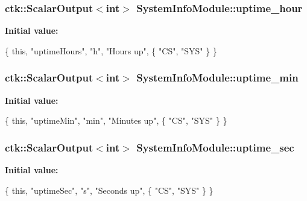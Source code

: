\subsubsection[{\texorpdfstring{uptime\+\_\+hour}{uptime_hour}}]{\setlength{\rightskip}{0pt plus 5cm}ctk\+::\+Scalar\+Output$<$int$>$ System\+Info\+Module\+::uptime\+\_\+hour}\hypertarget{classSystemInfoModule_a86c24e2c6715718cdcd5cb3596217f51}{}\label{classSystemInfoModule_a86c24e2c6715718cdcd5cb3596217f51}
{\bfseries Initial value\+:}
\begin{DoxyCode}
\{ \textcolor{keyword}{this}, \textcolor{stringliteral}{"uptimeHours"}, \textcolor{stringliteral}{"h"}, \textcolor{stringliteral}{"Hours up"},
    \{ \textcolor{stringliteral}{"CS"}, \textcolor{stringliteral}{"SYS"} \} \}
\end{DoxyCode}
\subsubsection[{\texorpdfstring{uptime\+\_\+min}{uptime_min}}]{\setlength{\rightskip}{0pt plus 5cm}ctk\+::\+Scalar\+Output$<$int$>$ System\+Info\+Module\+::uptime\+\_\+min}\hypertarget{classSystemInfoModule_a04d9e19050ba392140edc607cb2db40e}{}\label{classSystemInfoModule_a04d9e19050ba392140edc607cb2db40e}
{\bfseries Initial value\+:}
\begin{DoxyCode}
\{ \textcolor{keyword}{this}, \textcolor{stringliteral}{"uptimeMin"}, \textcolor{stringliteral}{"min"}, \textcolor{stringliteral}{"Minutes up"},
    \{ \textcolor{stringliteral}{"CS"}, \textcolor{stringliteral}{"SYS"} \} \}
\end{DoxyCode}
\subsubsection[{\texorpdfstring{uptime\+\_\+sec}{uptime_sec}}]{\setlength{\rightskip}{0pt plus 5cm}ctk\+::\+Scalar\+Output$<$int$>$ System\+Info\+Module\+::uptime\+\_\+sec}\hypertarget{classSystemInfoModule_af6f5afca2c2c21512f1ce728436862b4}{}\label{classSystemInfoModule_af6f5afca2c2c21512f1ce728436862b4}
{\bfseries Initial value\+:}
\begin{DoxyCode}
\{ \textcolor{keyword}{this}, \textcolor{stringliteral}{"uptimeSec"}, \textcolor{stringliteral}{"s"}, \textcolor{stringliteral}{"Seconds up"},
    \{ \textcolor{stringliteral}{"CS"}, \textcolor{stringliteral}{"SYS"} \} \}
\end{DoxyCode}
